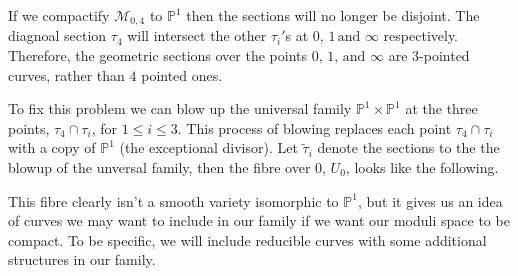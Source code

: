 \begin{example}
\begin{center}
    
    \end{center}

    If we compactify $\mathcal{M}_{0,4}$ to $\mathbb{P}^{1}$ then the sections will no longer be disjoint.
    The diagnoal section $\tau_{4}$ will intersect the other $\tau_{i}'$s at $0,\,1\,\text{and }\infty$ respectively. 
    Therefore, the geometric sections over the points $0,\,1,\, \text{and }\infty$ are $3$-pointed curves, rather than $4$ pointed ones.
    \par To fix this problem we can blow up the universal family $\mathbb{P}^{1} \times \mathbb{P}^{1}$ at the three points, $\tau_{4}\cap \tau_{i}$, for $1\leq i \leq 3$.
    This process of blowing replaces each point $\tau_{4}\cap \tau_{i}$ with a copy of $\mathbb{P}^{1}$ (the exceptional divisor).
    Let $\tilde{\tau}_{i}$ denote the sections to the the blowup of the unversal family, then the fibre over $0$, $U_{0}$, looks like the following.
    \begin{center}
    \end{center}
    This fibre clearly isn't a smooth variety isomorphic to $\mathbb{P}^{1}$, but it gives us an idea of curves we may want to include in our family if we want our moduli space to be compact. 
    To be specific, we will include reducible curves with some additional structures in our family.
\end{example}
